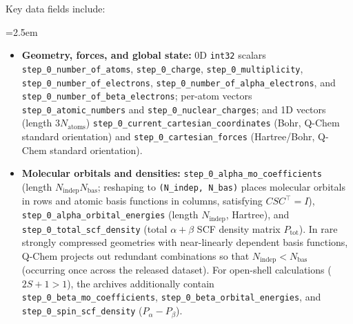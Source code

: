 \documentclass[fleqn,10pt]{article}
\begin{document}
Key data fields include:
{\emergencystretch=2.5em
\begin{itemize}
\item \textbf{Geometry, forces, and global state:} 0D \texttt{int32} scalars \texttt{step\_\allowbreak{}0\_\allowbreak{}number\_\allowbreak{}of\_\allowbreak{}atoms}, \texttt{step\_\allowbreak{}0\_\allowbreak{}charge}, \texttt{step\_\allowbreak{}0\_\allowbreak{}multiplicity}, \texttt{step\_\allowbreak{}0\_\allowbreak{}number\_\allowbreak{}of\_\allowbreak{}electrons}, \texttt{step\_\allowbreak{}0\_\allowbreak{}number\_\allowbreak{}of\_\allowbreak{}alpha\_\allowbreak{}electrons}, and \texttt{step\_\allowbreak{}0\_\allowbreak{}number\_\allowbreak{}of\_\allowbreak{}beta\_\allowbreak{}electrons}; per-atom vectors \texttt{step\_\allowbreak{}0\_\allowbreak{}atomic\_\allowbreak{}numbers} and \texttt{step\_\allowbreak{}0\_\allowbreak{}nuclear\_\allowbreak{}charges}; and 1D vectors (length $3N_{\mathrm{atoms}}$) \texttt{step\_\allowbreak{}0\_\allowbreak{}current\_\allowbreak{}cartesian\_\allowbreak{}coordinates} (Bohr, Q-Chem standard orientation) and \texttt{step\_\allowbreak{}0\_\allowbreak{}cartesian\_\allowbreak{}forces} (Hartree/Bohr, Q-Chem standard orientation).
\item \textbf{Molecular orbitals and densities:} \texttt{step\_\allowbreak{}0\_\allowbreak{}alpha\_\allowbreak{}mo\_\allowbreak{}coefficients} (length $N_{\mathrm{indep}} N_{\mathrm{bas}}$; reshaping to \texttt{(N\_\allowbreak{}indep, N\_\allowbreak{}bas)} places molecular orbitals in rows and atomic basis functions in columns, satisfying $C S C^{\top} = I$), \texttt{step\_\allowbreak{}0\_\allowbreak{}alpha\_\allowbreak{}orbital\_\allowbreak{}energies} (length $N_{\mathrm{indep}}$, Hartree), and \texttt{step\_\allowbreak{}0\_\allowbreak{}total\_\allowbreak{}scf\_\allowbreak{}density} (total $\alpha+\beta$ SCF density matrix $P_{\mathrm{tot}}$). In rare strongly compressed geometries with near-linearly dependent basis functions, Q-Chem projects out redundant combinations so that $N_{\mathrm{indep}} < N_{\mathrm{bas}}$ (occurring once across the released dataset). For open-shell calculations ($2S+1 > 1$), the archives additionally contain \texttt{step\_\allowbreak{}0\_\allowbreak{}beta\_\allowbreak{}mo\_\allowbreak{}coefficients}, \texttt{step\_\allowbreak{}0\_\allowbreak{}beta\_\allowbreak{}orbital\_\allowbreak{}energies}, and \texttt{step\_\allowbreak{}0\_\allowbreak{}spin\_\allowbreak{}scf\_\allowbreak{}density} ($P_{\alpha} - P_{\beta}$).

\end{itemize}}
\end{document}
